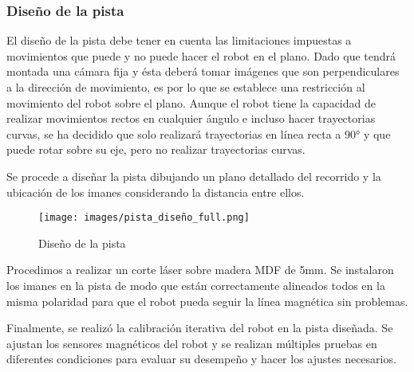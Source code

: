 \subsubsection{Diseño de la pista}

El diseño de la pista debe tener en cuenta las limitaciones impuestas a movimientos que puede y no puede hacer el robot en el plano. Dado que tendrá montada una cámara fija y ésta deberá tomar imágenes que son perpendiculares a la dirección de movimiento, es por lo que se establece una restricción al movimiento del robot sobre el plano. Aunque el robot tiene la capacidad de realizar movimientos rectos en cualquier ángulo e incluso hacer trayectorias curvas, se ha decidido que solo realizará trayectorias en línea recta a 90° y que puede rotar sobre su eje, pero no realizar trayectorias curvas.

Se procede a diseñar la pista dibujando un plano detallado del recorrido y la ubicación de los imanes considerando la distancia entre ellos.

\begin{figure}[H]
    \centering
    \texttt{[image: images/pista\_diseño\_full.png]}
    \caption{Diseño de la pista}
    \label{fig:disenopista}
\end{figure}

Procedimos a realizar un corte láser sobre madera MDF de 5mm. Se instalaron los imanes en la pista de modo que están correctamente alineados todos en la misma polaridad para que el robot pueda seguir la línea magnética sin problemas.

Finalmente, se realizó la calibración iterativa del robot en la pista diseñada. Se ajustan los sensores magnéticos del robot y se realizan múltiples pruebas en diferentes condiciones para evaluar su desempeño y hacer los ajustes necesarios.
